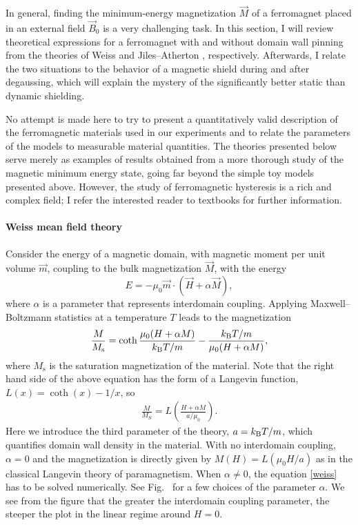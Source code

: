 In general, finding the minimum-energy magnetization $\vec M$ of a ferromagnet
placed in an external field $\vec B_0$ is a very challenging task. In this
section, I will review theoretical expressions for a ferromagnet with and
without domain wall pinning from the theories of Weiss \cite{weiss1907hypothese}
and Jiles--Atherton \cite{jiles1984theory}, respectively. Afterwards, I relate
the two situations to the behavior of a magnetic shield during and after
degaussing, which will explain the mystery of the significantly better static
than dynamic shielding.

No attempt is made here to try to present a quantitatively valid description of
the ferromagnetic materials used in our experiments and to relate the parameters
of the models to measurable material quantities. The theories presented below
serve merely as examples of results obtained from a more thorough study of the
magnetic minimum energy state, going far beyond the simple toy models presented
above. However, the study of ferromagnetic hysteresis is a rich and complex
field; I refer the interested reader to textbooks
\cite{mayergoyz2003mathematical} for further information.

\paragraph{Weiss mean field theory}

Consider the energy of a magnetic domain, with magnetic moment per unit volume
$\vec m$, coupling to the bulk magnetization $\vec M$, with the energy
%
\[
   E=-\mu_0\vec m\cdot(\vec H+\alpha\vec M),
\]
%
where $\alpha$ is a parameter that represents interdomain coupling. Applying
Maxwell--Boltzmann statistics at a temperature $T$ leads to the magnetization
\cite[eqn~1]{jiles1983ferromagnetic}
%
\begin{align}
   \label{weiss}
   \frac{M}{M_\text{s}}=\coth\frac{\mu_0(H+\alpha M)}{k_\text{B}
   T/m}-\frac{k_\text{B} T/m}{\mu_0(H+\alpha M)},
\end{align}
%
where $M_\text{s}$ is the saturation magnetization of the material. Note that
the right hand side of the above equation has the form of a Langevin function,
$L(x)=\coth(x)-1/x$, so
%
\begin{align}
   \label{weiss_langevin}
   \frac{M}{M_S}=L\left(\frac{H+\alpha M}{a/\mu_0}\right).
\end{align}
%
Here we introduce the third parameter of the theory, $a=k_\text{B} T/m$, which
quantifies domain wall density in the material. With no interdomain coupling,
$\alpha=0$ and the magnetization is directly given by $M(H)=L(\mu_0 H/a)$ as in
the classical Langevin theory of paramagnetism. When $\alpha\ne0$, the equation
\ref{weiss} has to be solved numerically. See Fig.~ for a few choices
of the parameter $\alpha$. We see from the figure that the greater the
interdomain coupling parameter, the steeper the plot in the linear regime around
$H=0$.

